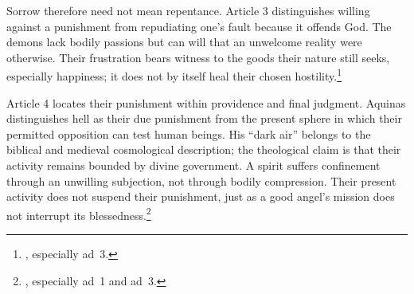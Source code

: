 Sorrow therefore need not mean repentance. Article 3 distinguishes willing against a punishment from repudiating one's fault because it offends God. The demons lack bodily passions but can will that an unwelcome reality were otherwise. Their frustration bears witness to the goods their nature still seeks, especially happiness; it does not by itself heal their chosen hostility.\footnote{, especially ad~3.}

Article 4 locates their punishment within providence and final judgment. Aquinas distinguishes hell as their due punishment from the present sphere in which their permitted opposition can test human beings. His ``dark air'' belongs to the biblical and medieval cosmological description; the theological claim is that their activity remains bounded by divine government. A spirit suffers confinement through an unwilling subjection, not through bodily compression. Their present activity does not suspend their punishment, just as a good angel's mission does not interrupt its blessedness.\footnote{, especially ad~1 and ad~3.}

